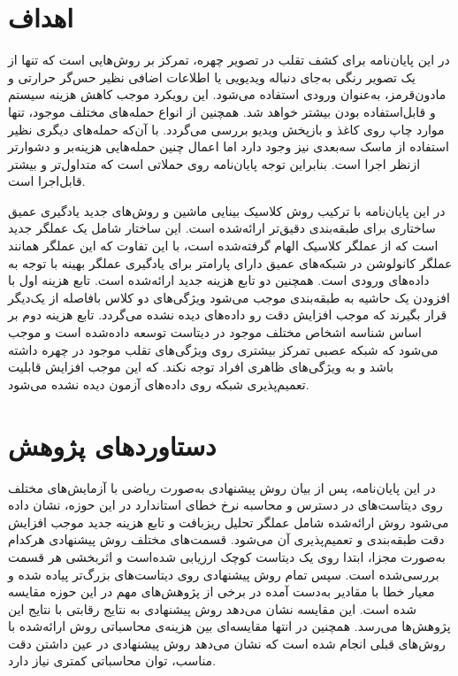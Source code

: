 \section{اهداف}
در این پایان‌نامه برای کشف تقلب در تصویر چهره، تمرکز بر روش‌هایی است که تنها از یک تصویر رنگی به‌جای دنباله ویدیویی یا اطلاعات اضافی نظیر حس‌گر حرارتی و مادون‌قرمز، به‌عنوان ورودی استفاده می‌شود. این رویکرد موجب کاهش هزینه سیستم و قابل‌استفاده بودن بیشتر خواهد شد. همچنین از انواع حمله‌های مختلف موجود، تنها موارد چاپ روی کاغذ و بازپخش ویدیو بررسی می‌گردد. با آن‌که حمله‌های دیگری نظیر استفاده از ماسک سه‌بعدی نیز وجود دارد اما اعمال چنین حمله‌هایی هزینه‌بر و دشوارتر از‌نظر اجرا است. بنابراین توجه پایان‌نامه روی حملاتی است که متداول‌تر و بیشتر قابل‌اجرا است. 

در این پایان‌نامه با ترکیب روش کلاسیک بینایی ماشین و روش‌های جدید یادگیری عمیق ساختاری برای طبقه‌بندی دقیق‌تر ارائه‌شده است. این ساختار شامل یک عملگر جدید است که از عملگر 
کلاسیک الهام گرفته‌شده است، با این تفاوت که این عملگر همانند عملگر کانولوشن در شبکه‌های عمیق دارای پارامتر برای یادگیری عملگر بهینه با توجه به داده‌های ورودی است. 
همچنین دو تابع هزینه جدید ارائه‌شده است. تابع هزینه اول با افزودن یک حاشیه به طبقه‌بندی موجب می‌شود ویژگی‌های دو کلاس با‌فاصله از یک‌دیگر قرار بگیرند که موجب افزایش دقت رو داده‌های دیده نشده می‌گردد. تابع هزینه دوم بر اساس شناسه اشخاص مختلف موجود در دیتاست توسعه داده‌شده است و موجب می‌شود که شبکه عصبی تمرکز بیشتری روی ویژگی‌های تقلب موجود در چهره داشته باشد و به ویژگی‌های ظاهری افراد توجه نکند. که این موجب افزایش قابلیت تعمیم‌پذیری شبکه روی داده‌های آزمون دیده نشده می‌شود.
\section{دستاورد‌های پژوهش}
در این پایان‌نامه، پس از بیان روش پیشنهادی به‌صورت ریاضی با آزمایش‌های مختلف روی دیتاست‌های در دسترس و محاسبه نرخ خطای استاندارد در این حوزه، نشان داده می‌شود روش ارائه‌شده شامل عملگر تحلیل ریزبافت و تابع هزینه جدید موجب افزایش دقت طبقه‌بندی و تعمیم‌پذیری آن می‌شود. قسمت‌های مختلف روش پیشنهادی هر‌کدام به‌صورت مجزا، ابتدا روی یک دیتاست کوچک ارزیابی شده‌است و اثر‌بخشی هر قسمت بررسی‌شده است. سپس تمام روش پیشنهادی روی دیتاست‌های بزرگ‌تر پیاده شده و معیار خطا با مقادیر به‌دست آمده در برخی از پژوهش‌های مهم در این حوزه مقایسه شده است. این مقایسه نشان می‌دهد روش پیشنهادی به نتایج رقابتی با نتایج این پژوهش‌ها می‌رسد. همچنین در انتها مقایسه‌ای بین هزینه‌ی محاسباتی روش ارائه‌شده با روش‌های قبلی انجام شده است که نشان می‌دهد روش پیشنهادی در عین داشتن دقت مناسب، توان محاسباتی کمتری نیاز دارد.

